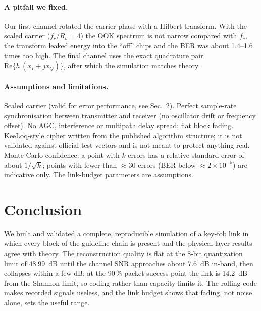 \documentclass[11pt,a4paper]{article}
\begin{document}
\paragraph{A pitfall we fixed.} Our first channel rotated the carrier phase with a Hilbert transform. With the scaled carrier ($f_c/R_b=4$) the OOK spectrum is not narrow compared with $f_c$, the transform leaked energy into the ``off'' chips and the BER was about 1.4--1.6 times too high.
The final channel uses the exact quadrature pair $\mathrm{Re}\{h\,(x_I+jx_Q)\}$, after which the simulation matches theory.

\paragraph{Assumptions and limitations.}
Scaled carrier (valid for error performance, see Sec.~2). Perfect sample-rate synchronisation between transmitter and receiver (no oscillator drift or frequency offset). No AGC, interference or multipath delay spread; flat block fading. KeeLoq-style cipher written from the published algorithm structure; it is not validated against official test vectors and is not meant to protect anything real.
Monte-Carlo confidence: a point with $k$ errors has a relative standard error of about $1/\sqrt{k}$; points with fewer than $\approx$30 errors (BER below $\approx2\times10^{-5}$) are indicative only. The link-budget parameters are assumptions.

\section{Conclusion}
We built and validated a complete, reproducible simulation of a key-fob link in which every block of the guideline chain is present and the physical-layer results agree with theory.
The reconstruction quality is flat at the 8-bit quantization limit of 48.99~dB until the channel SNR approaches about 7.6~dB in-band, then collapses within a few dB; at the 90\,\% packet-success point the link is 14.2~dB from the Shannon limit, so coding rather than capacity limits it. The rolling code makes recorded signals useless, and the link budget shows that fading, not noise alone, sets the useful range.
\end{document}
